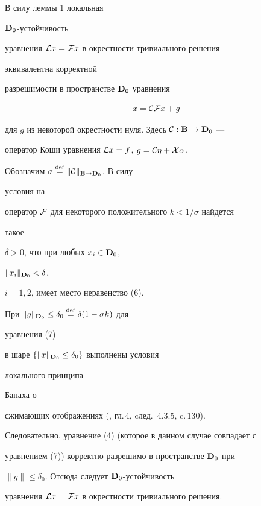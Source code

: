 \begin{pf}


В силу леммы 1 локальная


$\bold {D}_0$-устойчивость


уравнения ${\cal L}x={\cal F}x$ в окрестности тривиального решения


эквивалентна корректной


разрешимости в пространстве $\bold {D}_0$ уравнения


\begin{equation}


x={\cal C}{\cal F}x+g


\end{equation}


для $g$ из некоторой окрестности нуля. Здесь ${\cal


C}:\spc{B}\to\spc{D}_0$ ---


оператор Коши уравнения ${\cal L}x=f$, $g={\cal C}\eta+{\cal


X}\alpha$.


Обозначим $\sigma\overset{\mathrm{def}}{=}{}\|{\cal C}\|_{\bold{B}\to\bold{D}_0}$. В силу


условия на


оператор $\cal F$ для некоторого положительного $k<1/\sigma$ найдется


такое


$\delta>0$, что при любых $x_i\in\bold {D}_0$,


$\|x_i\|_{\bold{D}_0}<\delta$,


$i=1,2$, имеет место неравенство (6).





При $\|g\|_{\bold{D}_0}\le\delta_0\overset{\mathrm{def}}{=}{}\delta(1-\sigma k)$ для


уравнения (7)


в шаре $\{\|x\|_{\bold{D}_0}\le\delta_0\}$ выполнены условия


локального принципа


Банаха о


сжимающих отображениях (\cite{11}, гл.\,4, cлед.~4.3.5, c.\,130).


Следовательно, уравнение (4) (которое в данном случае совпадает с


уравнением (7)) корректно разрешимо в пространстве $\bold {D}_0$ при


$\|g\|\le\delta_0$. Отсюда следует $\bold {D}_0$-устойчивость


уравнения ${\cal L}x={\cal F}x$ в окрестности тривиального решения.


\end{pf}





